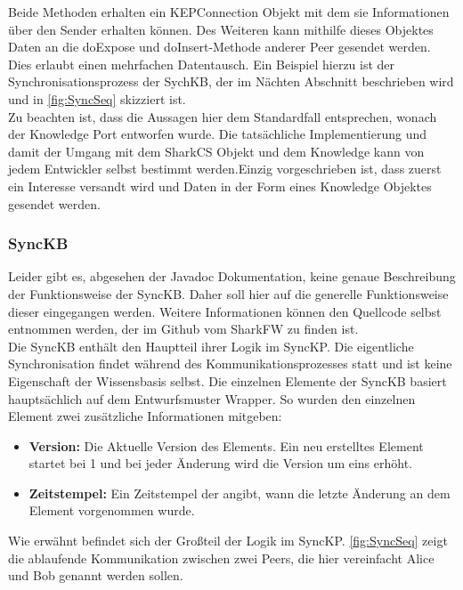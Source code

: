 \documentclass[a4paper]{article}
\begin{document}
	Beide Methoden erhalten ein KEPConnection Objekt mit dem sie Informationen 
	über den Sender erhalten können. Des Weiteren kann mithilfe dieses 
	Objektes Daten an die doExpose und doInsert-Methode anderer Peer gesendet
	werden. Dies erlaubt einen mehrfachen Datentausch. Ein Beispiel hierzu ist
	der Synchronisationsprozess der SychKB, der im Nächten Abschnitt beschrieben 
	wird und in \autoref{fig:SyncSeq} skizziert ist. \\
	
	Zu beachten ist, dass die Aussagen hier dem Standardfall entsprechen, wonach
	der Knowledge Port entworfen wurde. Die tatsächliche Implementierung und
	damit der Umgang mit dem SharkCS Objekt und dem Knowledge kann von jedem
	Entwickler selbst bestimmt werden.Einzig vorgeschrieben ist, dass zuerst
	ein Interesse versandt wird und Daten in der Form eines Knowledge Objektes
	gesendet werden.
	
	\subsubsection{SyncKB} 
	
	Leider gibt es, abgesehen der Javadoc Dokumentation, keine genaue
	Beschreibung der Funktionsweise der SyncKB. Daher soll hier auf die
	generelle Funktionsweise dieser eingegangen werden. Weitere Informationen
	können den Quellcode selbst entnommen werden, der im Github vom SharkFW
	zu finden ist. \cite{SyncKB} \\
	
	Die SyncKB enthält den Hauptteil ihrer Logik im SyncKP. Die eigentliche
	Synchronisation findet während des Kommunikationsprozesses statt und ist
	keine Eigenschaft der Wissensbasis selbst. Die einzelnen Elemente der SyncKB
	basiert hauptsächlich auf dem Entwurfsmuster Wrapper. So wurden den einzelnen
	Element zwei zusätzliche Informationen mitgeben: 
	
	\begin{itemize}
		\item \textbf{Version:} Die Aktuelle Version des Elements. Ein neu 
		erstelltes Element startet bei 1 und bei jeder Änderung wird die
		Version um eins erhöht.
		\item \textbf{Zeitstempel:} Ein Zeitstempel der angibt, wann die letzte
		Änderung an dem Element vorgenommen wurde.
	\end{itemize} 
	
	Wie erwähnt befindet sich der Großteil der Logik im SyncKP.
	\autoref{fig:SyncSeq} zeigt die ablaufende Kommunikation zwischen zwei
	Peers, die hier vereinfacht Alice und Bob genannt werden sollen.	
	
\end{document}
